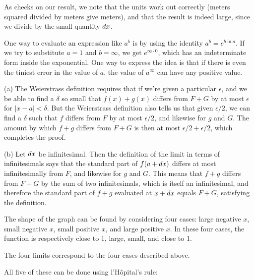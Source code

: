 As checks on our result, we note that the units work out correctly (meters squared divided by
meters give meters), and that the result is indeed large, since we divide by the small quantity $\mathop{d\!} x$.

One way to evaluate an expression like $a^b$ is by using the identity
$a^b=e^{b\ln a}$. If we try to substitute $a=1$ and $b=\infty$,
we get $e^{\infty\cdot 0}$, which has an indeterminate form inside
the exponential. One way to express the idea is that
if there is even the tiniest error in the value of $a$, the value of $a^\infty$
can have any positive value.



(a) The Weierstrass definition requires that if we're given a particular $\epsilon$, and we be able to find a $\delta$ so small that $f(x)+g(x)$
differs from $F+G$ by at most $\epsilon$ for $|x-a|<\delta$. But the Weierstrass definition also tells us that given $\epsilon/2$, we can find
a $\delta$ such that $f$ differs from $F$ by at most $\epsilon/2$, and likewise for $g$ and $G$. The amount by which $f+g$ differs from $F+G$
is then at most $\epsilon/2+\epsilon/2$, which completes the proof.

(b) Let $\mathop{d\!} x$ be infinitesimal. Then the definition of the limit in terms of infinitesimals says that the standard part of $f(a+\mathop{d\!} x)$
differs at most infinitesimally from $F$, and likewise for $g$ and $G$. This means that $f+g$ differs from $F+G$ by the sum of two infinitesimals,
which is itself an infinitesimal, and therefore the standard part of $f+g$ evaluated at $x+\mathop{d\!} x$ equals $F+G$, satisfying the definition.


The shape of the graph can be found by considering four cases: large negative $x$, small negative $x$, small positive $x$, and large positive $x$.
In these four cases, the function is respectively close to 1, large, small, and close to 1.


The four limits correspond to the four cases described above.

All five of these can be done using l'H\^{o}pital's rule:

